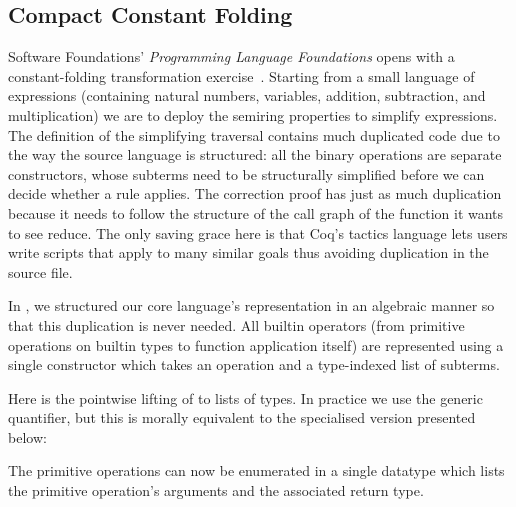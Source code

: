 \subsection{Compact Constant Folding}
\label{sec:design:constants}

Software Foundations' \emph{Programming Language Foundations}
opens with a constant-folding transformation exercise~\cite[Chapter~1]{Pierce:SF2}.
%
Starting from a small language of expressions (containing natural numbers, variables, addition, subtraction, and multiplication) we are to deploy the semiring properties to simplify expressions.
%
The definition of the simplifying traversal contains much duplicated code due to the way the source language is structured:
%
all the binary operations are separate constructors, whose subterms need to be structurally simplified before we can decide whether a rule applies.
%
The correction proof has just as much duplication because it needs to follow the structure of the call graph of the function it wants to see reduce.
%
The only saving grace here is that Coq's tactics language lets users write scripts that apply to many similar goals thus avoiding duplication in the source file.

In \Velo{}, we structured our core language's representation in an algebraic
manner so that this duplication is never needed.
%
All builtin operators (from primitive operations on builtin types to function
application itself) are represented using a single  constructor
which takes an operation and a type-indexed list of subterms.



Here  is the pointwise lifting of  to lists
of types. In practice we use the generic  quantifier, but this
is morally equivalent to the specialised version presented below:


The primitive operations can now be enumerated in a single datatype
 which lists the primitive operation's arguments and
the associated return type.

\begin{comment}
\IdrisData{Zero}---which takes no argument and returns a term of type \IdrisData{TyNat};
%
\IdrisData{Inc}---which takes an argument of type \IdrisData{TyNat} and returns a term
of type \IdrisData{TyNat};
%
and
%
\IdrisData{App}---which takes a function and an argument that corresponds to the type of the function's domain and returns a term that is the type of the function's co-domain.
\end{comment}

